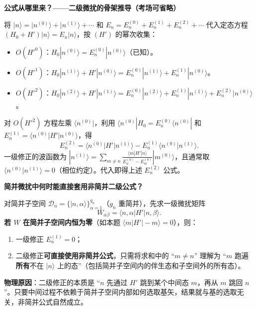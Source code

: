 \begin{derivationbox}[二级微扰的骨架推导]
\textbf{公式从哪里来？——二级微扰的骨架推导（考场可省略）}

将 $|n\rangle = |n^{(0)}\rangle + |n^{(1)}\rangle + \cdots$ 和 $E_n = E_n^{(0)} + E_n^{(1)} + E_n^{(2)} + \cdots$ 代入定态方程 $(H_0+H')|n\rangle = E_n|n\rangle$，按 $(H')$ 的幂次收集：
\begin{itemize}
    \item $O(H'^0)$：$H_0|n^{(0)}\rangle = E_n^{(0)}|n^{(0)}\rangle$（已知）。
    \item $O(H'^1)$：$H_0|n^{(1)}\rangle + H'|n^{(0)}\rangle = E_n^{(0)}|n^{(1)}\rangle + E_n^{(1)}|n^{(0)}\rangle$。
    \item $O(H'^2)$：$H_0|n^{(2)}\rangle + H'|n^{(1)}\rangle = E_n^{(0)}|n^{(2)}\rangle + E_n^{(1)}|n^{(1)}\rangle + E_n^{(2)}|n^{(0)}\rangle$。
\end{itemize}
对 $O(H'^2)$ 方程左乘 $\langle n^{(0)}|$，利用 $\langle n^{(0)}|H_0 = E_n^{(0)}\langle n^{(0)}|$ 和 $E_n^{(1)} = \langle n^{(0)}|H'|n^{(0)}\rangle$，得
\[
E_n^{(2)} = \langle n^{(0)}|H'|n^{(1)}\rangle - E_n^{(1)}\langle n^{(0)}|n^{(1)}\rangle.
\]
一级修正的波函数为 $|n^{(1)}\rangle = \sum_{m\neq n} \frac{\langle m|H'|n\rangle}{E_n^{(0)}-E_m^{(0)}}|m^{(0)}\rangle$，且通常取 $\langle n^{(0)}|n^{(1)}\rangle = 0$（相位约定）。代入即得上述 $E_n^{(2)}$ 公式。
\end{derivationbox}

\begin{insightbox}[简并微扰中何时能直接套用非简并二级公式]
\textbf{简并微扰中何时能直接套用非简并二级公式？}

对简并子空间 $\mathcal{D}_n = \{|n,\alpha\rangle\}_{\alpha=1}^{g_n}$（$g_n$ 重简并），先求一级微扰矩阵
\[
W_{\alpha\beta} = \langle n,\alpha|H'|n,\beta\rangle.
\]
\textbf{若 $W$ 在简并子空间内恒为零}（如本题 $\langle m|H'|-m\rangle=0$），则：
\begin{enumerate}
    \item 一级修正 $E_n^{(1)}=0$；
    \item 二级修正\textbf{可直接使用非简并公式}，只需将求和中的 ``$m\neq n$'' 理解为 ``$m$ 跑遍\textbf{所有}不在 $|n\rangle$ 上的态''（包括简并子空间内的伴生态和子空间外的所有态）。
\end{enumerate}
\textbf{物理原因}：二级修正的本质是 ``$n$ 先通过 $H'$ 跳到某个中间态 $m$，再从 $m$ 跳回 $n$''。只要中间过程不依赖于简并子空间内部如何选取基矢，结果就与基的选取无关，非简并公式自然成立。
\end{insightbox}

